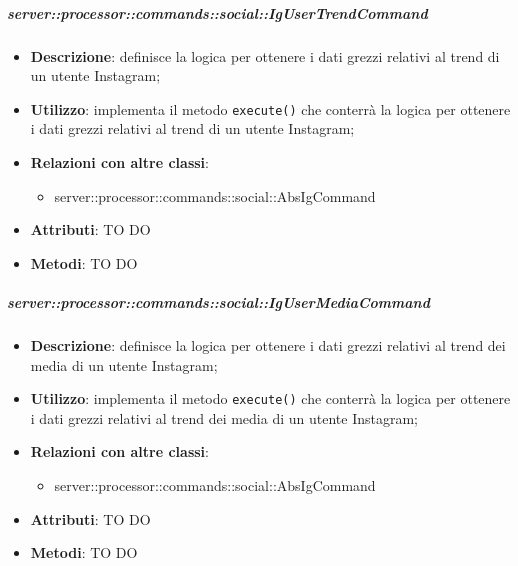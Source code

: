         \subparagraph{server::processor::commands::social::IgUserTrendCommand} %
        \label{subp:bdsm_app_server_processor_commands_social_igusertrendcommand}
        \begin{itemize}
          \item \textbf{Descrizione}: definisce la logica per ottenere i dati grezzi relativi al trend di un utente Instagram;
          \item \textbf{Utilizzo}: implementa il metodo \texttt{execute()} che conterrà la logica per ottenere i dati grezzi relativi al trend di un utente Instagram;
          \item \textbf{Relazioni con altre classi}:
            \begin{itemize}
              \item server::processor::commands::social::AbsIgCommand
            \end{itemize}
			\item \textbf{Attributi}: TO DO
			\item \textbf{Metodi}: TO DO
        \end{itemize}

        \subparagraph{server::processor::commands::social::IgUserMediaCommand} %
        \label{subp:bdsm_app_server_processor_commands_social_igusermediacommand}
        \begin{itemize}
          \item \textbf{Descrizione}: definisce la logica per ottenere i dati grezzi relativi al trend dei media di un utente Instagram;
          \item \textbf{Utilizzo}: implementa il metodo \texttt{execute()} che conterrà la logica per ottenere i dati grezzi relativi al trend dei media di un utente Instagram;
          \item \textbf{Relazioni con altre classi}:
            \begin{itemize}
              \item server::processor::commands::social::AbsIgCommand
            \end{itemize}
			\item \textbf{Attributi}: TO DO
			\item \textbf{Metodi}: TO DO
        \end{itemize}

